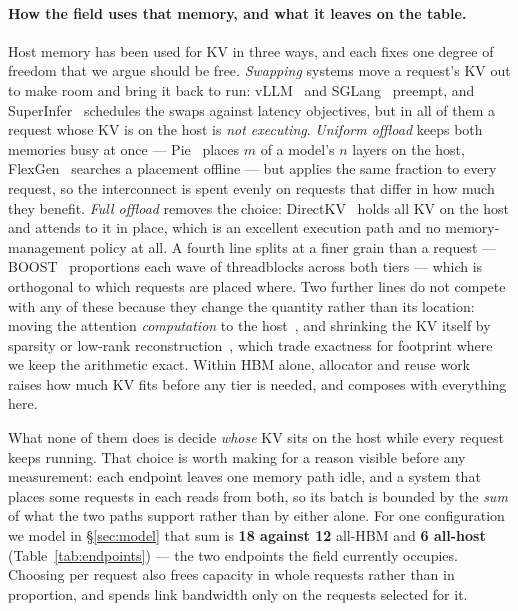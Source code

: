 \paragraph{How the field uses that memory, and what it leaves on the table.}
Host memory has been used for KV in three ways, and each fixes one degree of freedom
that we argue should be free. \emph{Swapping} systems move a request's KV out to make
room and bring it back to run: vLLM~\cite{vllm} and SGLang~\cite{sglang} preempt,
and SuperInfer~\cite{superinfer} schedules the swaps against latency objectives, but
in all of them a request whose KV is on the host is \emph{not executing}.
\emph{Uniform offload} keeps both memories busy at once --- Pie~\cite{pie} places
$m$ of a model's $n$ layers on the host, FlexGen~\cite{flexgen} searches a placement
offline --- but applies the same fraction to every request, so the interconnect is
spent evenly on requests that differ in how much they benefit. \emph{Full offload}
removes the choice: DirectKV~\cite{directkv} holds all KV on the host and attends to
it in place, which is an excellent execution path and no memory-management policy at
all. A fourth line splits at a finer grain than a request --- BOOST~\cite{boost}
proportions each wave of threadblocks across both tiers --- which is orthogonal to
which requests are placed where. Two further lines do not compete with any of these
because they change the quantity rather than its location: moving the attention
\emph{computation} to the host~\cite{neo}, and shrinking the KV itself by sparsity
or low-rank reconstruction~\cite{shadowkv,infinigen}, which trade exactness for
footprint where we keep the arithmetic exact. Within HBM alone, allocator and reuse
work~\cite{vllm,vattention,cachedattention} raises how much KV fits before any tier
is needed, and composes with everything here.

What none of them does is decide \emph{whose} KV sits on the host while every
request keeps running. That choice is worth making for a reason visible before any
measurement: each endpoint leaves one memory path idle, and a system that places
some requests in each reads from both, so its batch is bounded by the \emph{sum} of
what the two paths support rather than by either alone. For one configuration we
model in \S\ref{sec:model} that sum is \textbf{18 against 12} all-HBM and
\textbf{6 all-host} (Table~\ref{tab:endpoints}) --- the two endpoints the field
currently occupies. Choosing per request also frees capacity in whole requests
rather than in proportion, and spends link bandwidth only on the requests selected
for it.

